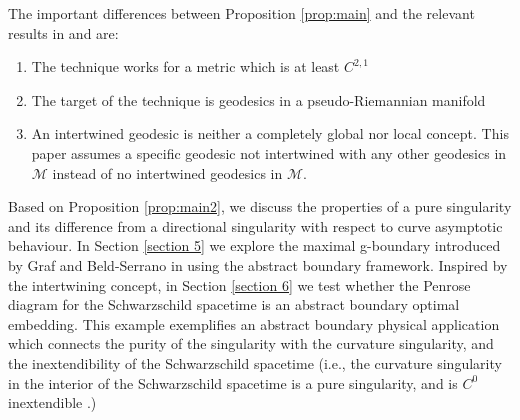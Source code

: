 \documentclass[pdflatex,sn-mathphys-num]{sn-jnl}
\theoremstyle{definition}
\begin{document}
The important differences between Proposition \ref{prop:main} and the relevant results in \cite{Graf_2024} and \cite{chrusciel2006conformalboundaryextensionslorentzian} are: 
\begin{enumerate}
    \item The technique works for a metric which is at least $C^{2,1}$
    \item The target of the technique is geodesics in a pseudo-Riemannian manifold
    \item An intertwined geodesic is neither a completely global nor local concept. This paper assumes a specific geodesic not intertwined with any other geodesics in $\mathcal{M}$ instead of no intertwined geodesics in $\mathcal{M}$.
\end{enumerate}
Based on Proposition \ref{prop:main2}, we discuss the properties of a pure singularity and its difference from a directional singularity with respect to curve asymptotic behaviour. In Section \ref{section 5} we explore the maximal g-boundary introduced by Graf and Beld-Serrano in \cite{Graf_2024} using the abstract boundary framework. Inspired by the intertwining concept, in Section \ref{section 6} we  test whether the Penrose diagram for the Schwarzschild spacetime is an abstract boundary optimal embedding. This example exemplifies an abstract boundary physical application which connects the purity of the singularity with the curvature singularity, and the inextendibility of the Schwarzschild spacetime (i.e., the curvature singularity in the interior of the Schwarzschild spacetime is a pure singularity, and is $C^0$ inextendible \cite{Sbierski:2015nta}.)\\
\end{document}
